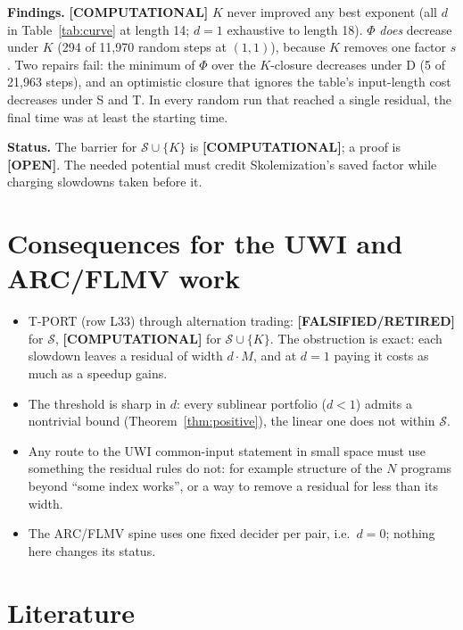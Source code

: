 \documentclass[11pt]{article}
\theoremstyle{definition}
\theoremstyle{remark}
\newcommand{\status}[1]{\textbf{[#1]}}
\begin{document}
\noindent\textbf{Findings.} \status{COMPUTATIONAL} $K$ never improved any best exponent (all $d$ in
Table~\ref{tab:curve} at length 14; $d=1$ exhaustive to length 18). $\Phi$ \emph{does} decrease under $K$
(294 of 11,970 random steps at $(1,1)$), because $K$ removes one factor $s$. Two repairs fail: the minimum
of $\Phi$ over the $K$-closure decreases under D (5 of 21,963 steps), and an optimistic closure that
ignores the table's input-length cost decreases under S and T. In every random run that reached a single
residual, the final time was at least the starting time.

\noindent\textbf{Status.} The barrier for $\mathcal S\cup\{K\}$ is \status{COMPUTATIONAL}; a proof is
\status{OPEN}. The needed potential must credit Skolemization's saved factor while charging slowdowns
taken before it.

\section{Consequences for the UWI and ARC/FLMV work}

\begin{itemize}
\item T-PORT (row L33) through alternation trading: \status{FALSIFIED/RETIRED} for $\mathcal S$,
\status{COMPUTATIONAL} for $\mathcal S\cup\{K\}$. The obstruction is exact: each slowdown leaves a
residual of width $d\cdot M$, and at $d=1$ paying it costs as much as a speedup gains.
\item The threshold is sharp in $d$: every sublinear portfolio ($d<1$) admits a nontrivial bound
(Theorem~\ref{thm:positive}), the linear one does not within $\mathcal S$.
\item Any route to the UWI common-input statement in small space must use something the residual
rules do not: for example structure of the $N$ programs beyond ``some index works'', or a way to
remove a residual for less than its width.
\item The ARC/FLMV spine uses one fixed decider per pair, i.e.\ $d=0$; nothing here changes its status.
\end{itemize}

\section{Literature}
\end{document}
